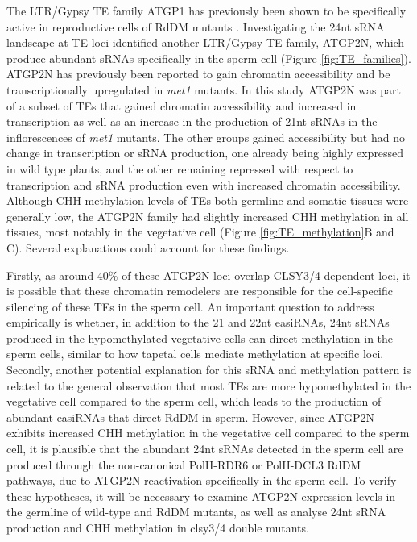 The LTR/Gypsy TE family ATGP1 has previously been shown to be specifically active in reproductive cells of RdDM mutants \cite{RN187}. Investigating the 24nt sRNA landscape at TE loci identified another LTR/Gypsy TE family, ATGP2N, which produce abundant sRNAs specifically in the sperm cell (Figure \ref{fig:TE_families}). ATGP2N has previously been reported to gain chromatin accessibility and be transcriptionally upregulated in \textit{met1} mutants. In this study ATGP2N was part of a subset of TEs that gained chromatin accessibility and increased in transcription as well as an increase in the production of 21nt sRNAs in the inflorescences of \textit{met1} mutants. The other groups gained accessibility but had no change in transcription or sRNA production, one already being highly expressed in wild type plants, and the other remaining repressed with respect to transcription and sRNA production even with increased chromatin accessibility\cite{RN184}. Although CHH methylation levels of TEs  both germline and somatic tissues were generally low, the ATGP2N family had slightly increased CHH methylation in all tissues, most notably in the vegetative cell (Figure \ref{fig:TE_methylation}B and C). Several explanations could account for these findings. 

Firstly, as around 40\% of these ATGP2N loci overlap CLSY3/4 dependent loci, it is possible that these chromatin remodelers are responsible for the cell-specific silencing of these TEs in the sperm cell. An important question to address empirically is whether, in addition to the 21 and 22nt easiRNAs, 24nt sRNAs produced in the hypomethylated vegetative cells can direct methylation in the sperm cells, similar to how tapetal cells mediate methylation at specific loci. Secondly, another potential explanation for this sRNA and methylation pattern is related to the general observation that most TEs are more hypomethylated in the vegetative cell compared to the sperm cell, which leads to the production of abundant easiRNAs that direct RdDM in sperm.  However, since ATGP2N exhibits increased CHH methylation in the vegetative cell compared to the sperm cell, it is plausible that the abundant 24nt sRNAs detected in the sperm cell are produced through the non-canonical PolII-RDR6 or PolII-DCL3 RdDM pathways, due to ATGP2N reactivation specifically in the sperm cell. To verify these hypotheses, it will be necessary to examine ATGP2N expression levels in the germline of wild-type and RdDM mutants, as well as analyse 24nt sRNA production and CHH methylation in clsy3/4 double mutants.

